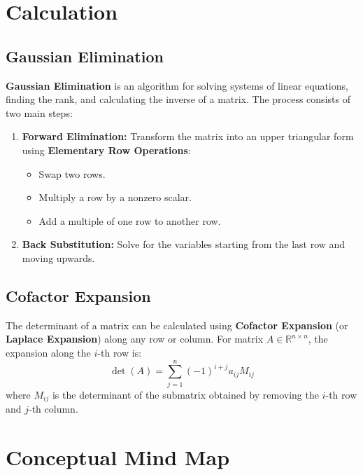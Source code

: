 \documentclass{article}
\begin{document}
\newpage
\section{Calculation}

\subsection{Gaussian Elimination}
\label{subsec:gauss}

\textbf{Gaussian Elimination} is an algorithm for solving systems of linear equations, finding the rank, and calculating the inverse of a matrix. The process consists of two main steps:

\begin{enumerate}
    \item \textbf{Forward Elimination:} Transform the matrix into an upper triangular form using \textbf{Elementary Row Operations}:
    \begin{itemize}
        \item Swap two rows.
        \item Multiply a row by a nonzero scalar.
        \item Add a multiple of one row to another row.
    \end{itemize}
    \item \textbf{Back Substitution:} Solve for the variables starting from the last row and moving upwards.
\end{enumerate}

\subsection{Cofactor Expansion}
\label{subsec:cofactor}
The determinant of a matrix can be calculated using \textbf{Cofactor Expansion} (or \textbf{Laplace Expansion}) along any row or column. For matrix $A \in \mathbb{R}^{n \times n}$, the expansion along the $i$-th row is:
\[
    \det(A) = \sum_{j=1}^{n} (-1)^{i+j} a_{ij} M_{ij}
\]
where $M_{ij}$ is the determinant of the submatrix obtained by removing the $i$-th row and $j$-th column.


\newpage
\section{Conceptual Mind Map}
\end{document}
